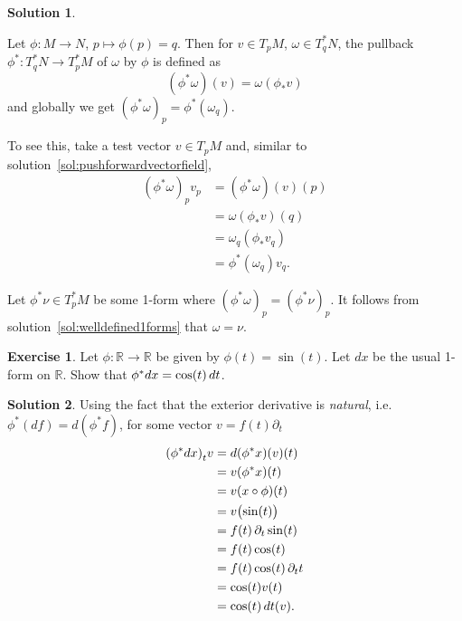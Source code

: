 \documentclass[11pt, a4paper]{report}
\theoremstyle{definition}
\newtheorem{exercise}{Exercise}[part]
\newtheorem{solution}{Solution}[part]
\newenvironment{ex}{\begin{exercise}}{\end{exercise}\pagebreak[1]}
\newenvironment{sol}{\begin{solution}}{\end{solution}\pagebreak[3]}
\newenvironment{nowidthtags}{\usetagform{nowidth}}{\ignorespacesafterend}
\newcommand*{\op}[1]{\ensuremath\mathop{}\mathopen{}#1}
\renewcommand*{\d}{\op{d}}
\begin{document}
\begin{sol}\label{sol:pullback1form}

Let $\phi: M \to N$, $p \mapsto \phi(p) = q$. Then for $v \in T_p M$, $\omega \in T_q^* N$, the pullback $\phi^*: T_q^* N \to T_p^* M$ of $\omega$ by $\phi$ is defined as
\begin{nowidthtags}
\[
    (\phi^* \omega)(v) = \omega(\phi_* v) \tag{pullback of a 1-form}\label{eq:pullback1form}
\]
\end{nowidthtags}
and globally we get ${(\phi^* \omega)}_p = \phi^*(\omega_q)$.

To see this, take a test vector $v \in T_p M$ and, similar to solution~\ref{sol:pushforwardvectorfield},
\begin{align*}
    {(\phi^* \omega)}_p v_p &= (\phi^* \omega) (v) (p) \\
        &= \omega(\phi_* v)(q) \\
        &= \omega_q (\phi_* v_q) \\
        &= \phi^* (\omega_q) v_q.
\end{align*}

Let $\phi^*\nu \in T_p^* M$ be some 1-form where ${(\phi^*\omega)}_p = {(\phi^*\nu)}_p$. It follows from solution~\ref{sol:welldefined1forms} that $\omega = \nu$.

\end{sol}

\begin{ex}

Let $\phi: \mathbb{R} \to \mathbb{R}$ be given by $\phi(t) = \sin(t)$. Let $dx$ be the usual 1-form on $\mathbb{R}$. Show that $\phi^*dx = \cos(t) \d t$.

\end{ex}

\begin{sol}

Using the fact that the exterior derivative is \emph{natural}, i.e. $\phi^*(df) = d(\phi^*f)$, for some vector $v = f(t)\partial_t$
\begin{align*}
    {(\phi^* dx)}_t v &= d(\phi^* x) (v)(t) \\
        &= v(\phi^* x) (t) \\
        &= v(x \circ \phi)(t) \\
        &= v \bigl( \sin(t) \bigr) \\
        &= f(t) \op{\partial}_t \sin(t) \\
        &= f(t) \cos(t) \\
        &= f(t) \cos(t) \op{\partial}_t t \\
        &= \cos(t) v(t) \\
        &= \cos(t) \d t(v).
\end{align*}

\end{sol}
\end{document}
